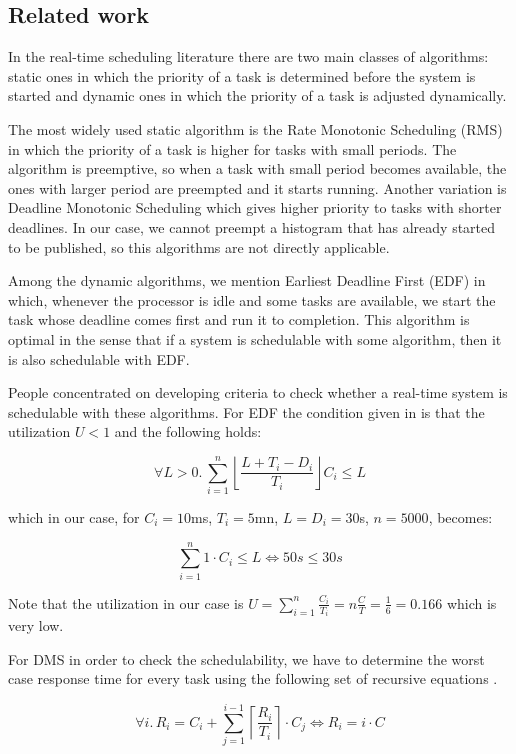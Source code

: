 \subsection*{Related work}

In the real-time scheduling literature there are two main classes of algorithms: static ones in which the priority of a task is determined before the system is started and dynamic ones in which the priority of a task is adjusted dynamically. 

The most widely used static algorithm is the Rate Monotonic Scheduling (RMS) \citep{liu1973scheduling} in which the priority of a task is higher for tasks with small periods. The algorithm is preemptive, so when a task with small period becomes available, the ones with larger period are preempted and it starts running. Another variation is Deadline Monotonic Scheduling which gives higher priority to tasks with shorter deadlines. In our case, we cannot preempt a histogram that has already started to be published, so this algorithms are not directly applicable. 

Among the dynamic algorithms, we mention Earliest Deadline First (EDF) \citep{liu1973scheduling} in which, whenever the processor is idle and some tasks are available, we start the task whose deadline comes first and run it to completion. This algorithm is optimal in the sense that if a system is schedulable with some algorithm, then it is also schedulable with EDF.

People concentrated on developing criteria to check whether a real-time system is schedulable with these algorithms. For EDF the condition given in \citep{baruah1990algorithms} is that the utilization $U < 1$ and the following holds:

$$ \forall L > 0.\,  \sum_{i=1}^n \left\lfloor \frac{L+T_i-D_i}{T_i}\right\rfloor C_i \le L $$

which in our case, for $C_i=10$ms, $T_i=5$mn, $L=D_i=30$s, $n=5000$, becomes:

$$ \sum_{i=1}^n 1 \cdot C_i \le L \Leftrightarrow 50s \le 30s $$

Note that the utilization in our case is $U=\sum_{i=1}^n\frac{C_i}{T_i}=n\frac C T = \frac 1 6 = 0.166$ which is very low. 

For DMS in order to check the schedulability, we have to determine the worst case response time for every task using the following set of recursive equations \citep{joseph1986finding}.

 $$ \forall i.\, R_i=C_i+\sum_{j=1}^{i-1} \left\lceil \frac{R_i}{T_i} \right\rceil \cdot C_j \Leftrightarrow R_i = i\cdot C$$
 
